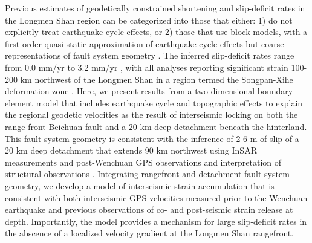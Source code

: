 \documentclass[12pt]{article}
\begin{document}
Previous estimates of geodetically constrained shortening and slip-deficit rates in the Longmen Shan region can be categorized into those that either: 1) do not explicitly treat earthquake cycle effects, \citep{chen00, shen05, Thatcher2007} or 2) those that use block models, with a first order quasi-static approximation of earthquake cycle effects but coarse representations of fault system geometry \citep{Meade07c, Loveless2011, Burchfiel2008}. The inferred slip-deficit rates range from 0.0 mm/yr \citep{Thatcher2007} to 3.2 mm/yr \citep{Loveless2011}, with all analyses reporting significant strain 100-200 km northwest of the Longmen Shan in a region termed the Songpan-Xihe deformation zone \citep{shen05}. Here, we present results from a two-dimensional boundary element model that includes earthquake cycle and topographic effects to explain the regional geodetic velocities as the result of interseismic locking on both the range-front Beichuan fault and a 20 km deep detachment beneath the hinterland. This fault system geometry is consistent with the inference of 2-6 m of slip of a 20 km deep detachment that extends 90 km northwest using InSAR measurements and post-Wenchuan GPS observations \citep{Qi2011, Fielding2013b} and interpretation of structural observations \citep{Hubbard2010, Li2010a}. Integrating rangefront and detachment fault system geometry, we develop a model of interseismic strain accumulation that is consistent with both interseismic GPS velocities measured prior to the Wenchuan earthquake and previous observations of co- and post-seismic strain release at depth. Importantly, the model provides a mechanism for large slip-deficit rates in the abscence of a localized velocity gradient at the Longmen Shan rangefront.
\end{document}
